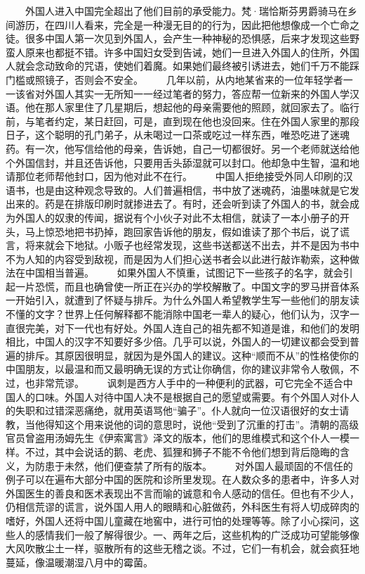 \documentclass[12pt,oneside]{book}
\begin{document}
\begin{common-format}
　　外国人进入中国完全超出了他们目前的承受能力。梵·瑞恰斯芬男爵骑马在乡间游历，在四川人看来，完全是一种漫无目的的行为，因此把他想像成一个亡命之徒。很多中国人第一次见到外国人，会产生一种神秘的恐惧感，后来才发现这些野蛮人原来也都挺不错。许多中国妇女受到告诫，她们一旦进入外国人的住所，外国人就会念动致命的咒语，使她们着魔。如果她们最终被引诱进去，她们千万不能踩门槛或照镜子，否则会不安全。 
　　几年以前，从内地某省来的一位年轻学者一一该省对外国人其实一无所知一一经过笔者的努力，答应帮一位新来的外国人学汉语。他在那人家里住了几星期后，想起他的母亲需要他的照顾，就回家去了。临行前，与笔者约定，某日赶回，可是，直到现在他也没回来。住在外国人家里的那段日子，这个聪明的孔门弟子，从未喝过一口茶或吃过一样东西，唯恐吃进了迷魂药。有一次，他写信给他的母亲，告诉她，自己一切都很好。另一个老师就送给他个外国信封，并且还告诉他，只要用舌头舔湿就可以封口。他却急中生智，温和地请那位老师帮他封口，因为他对此不在行。 
　　中国人拒绝接受外同人印刷的汉语书，也是由这种观念导致的。人们普遍相信，书中放了迷魂药，油墨味就是它发出来的。药是在排版印刷时就掺进去了。有时，还会听到读了外国人的书，就会成为外国人的奴隶的传闻，据说有个小伙子对此不太相信，就读了一本小册子的开头，马上惊恐地把书扔掉，跑回家告诉他的朋友，假如谁读了那个书后，说了谎言，将来就会下地狱。小贩子也经常发现，这些书送都送不出去，并不是因为书中不为人知的内容受到敌视，而是因为人们担心送书者会以此进行敲诈勒索，这种做法在中国相当普遍。 
　　如果外国人不慎重，试图记下一些孩子的名字，就会引起一片恐慌，而且也确曾使一所正在兴办的学校解散了。中国文字的罗马拼音体系一开始引入，就遭到了怀疑与排斥。为什么外国人希望教学生写一些他们的朋友读不懂的文字？世界上任何解释都不能消除中国老一辈人的疑心，他们认为，汉字一直很完美，对下一代也有好处。外国人连自己的祖先都不知道是谁，和他们的发明相比，中国人的汉字不知要好多少倍。几乎可以说，外国人的一切建议都会受到普遍的排斥。其原因很明显，就因为是外国人的建议。这种“顺而不从”的性格使你的中国朋友，以最温和而又最明确无误的方式让你确信，你的建议非常令人敬佩，不过，也非常荒谬。 
　　讽刺是西方人手中的一种便利的武器，可它完全不适合中国人的口味。外国人对待中国人决不是根据自己的愿望或需要。有个外国人对仆人的失职和过错深恶痛绝，就用英语骂他“骗子”。仆人就向一位汉语很好的女士请教，当他得知这个用来说他的词的意思时，说他“受到了沉重的打击”。清朝的高级官员曾盗用汤姆先生《伊索寓言》泽文的版本，他们的思维模式和这个仆人一模一样。不过，其中会说话的鹅、老虎、狐狸和狮子不能不令他们想到背后隐晦的含义，为防患于未然，他们便查禁了所有的版本。 
　　对外国人最顽固的不信任的例子可以在遍布大部分中国的医院和诊所里发现。在人数众多的患者中，许多人对外国医生的善良和医术表现出不言而喻的诚意和令人感动的信任。但也有不少人，仍相信荒谬的谎言，说外国人用人的眼睛和心脏做药，外科医生有将人切成碎肉的嗜好，外国人还将中国儿童藏在地窖中，进行可怕的处理等等。除了小心探问，这些人的感情我们一般了解得很少。一、两年之后，这些机构的广泛成功可望能够像大风吹散尘土一样，驱散所有的这些无稽之谈。不过，它们一有机会，就会疯狂地蔓延，像温暖潮湿八月中的霉菌。 

\end{common-format}
\end{document}
